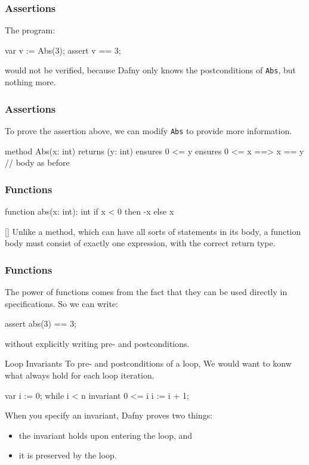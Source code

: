 \documentclass[10pt, compress]{beamer}
\begin{document}
\begin{frame}[fragile]
  \frametitle{Assertions}

  The program:
  \begin{verbnobox}[\footnotesize]
var v := Abs(3);
assert v == 3;
  \end{verbnobox}
  would not be verified, because Dafny only knows the postconditions of \verb|Abs|, but nothing more.
\end{frame}

\begin{frame}[fragile]
  \frametitle{Assertions}
  To prove the assertion above, we can modify \verb|Abs| to provide more information.
  \begin{verbnobox}[\footnotesize]
method Abs(x: int) returns (y: int)
   ensures 0 <= y
   ensures 0 <= x ==> x == y
{
   // body as before
}
  \end{verbnobox}
\end{frame}

\begin{frame}[fragile]
  \frametitle{Functions}
  \begin{verbnobox}[\footnotesize]
function abs(x: int): int
{
   if x < 0 then -x else x
}
  \end{verbnobox}[\footnotesize]
  Unlike a method, which can have all sorts of statements in its body, a function body must consist of exactly one expression, with the correct return type.
\end{frame}

\begin{frame}[fragile]
  \frametitle{Functions}
The power of functions comes from the fact that they can be used directly in specifications. So we can write:
  \begin{verbnobox}[\footnotesize]
assert abs(3) == 3;
  \end{verbnobox}
without explicitly writing pre- and postconditions.

\end{frame}

\begin{frame}[fragile]{Loop Invariants}
To pre- and postconditions of a loop, We would want to konw what always hold for each loop iteration.
  \begin{verbnobox}[\footnotesize]
var i := 0;
while i < n
   invariant 0 <= i
{
   i := i + 1;
}
  \end{verbnobox}
When you specify an invariant, Dafny proves two things:
  \begin{itemize}
  \item the invariant holds upon entering the loop, and
  \item it is preserved by the loop.
  \end{itemize}
\end{frame}
\end{document}
